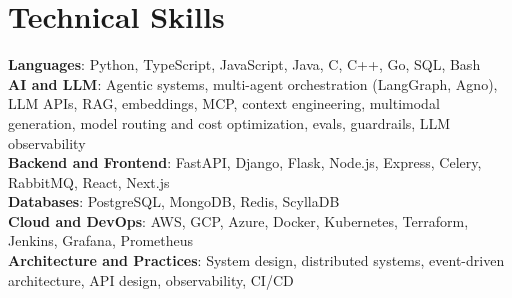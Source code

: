 \section{Technical Skills}
\small
\textbf{Languages}{: \small Python, TypeScript, JavaScript, Java, C, C++, Go, SQL, Bash} \\
\vspace{2.5pt}\textbf{AI and LLM}{: \small Agentic systems, multi-agent orchestration (LangGraph, Agno), LLM APIs, RAG, embeddings, MCP, context engineering, multimodal generation, model routing and cost optimization, evals, guardrails, LLM observability} \\
\vspace{2.5pt}\textbf{Backend and Frontend}{: \small FastAPI, Django, Flask, Node.js, Express, Celery, RabbitMQ, React, Next.js} \\
\vspace{2.5pt}\textbf{Databases}{: \small PostgreSQL, MongoDB, Redis, ScyllaDB} \\
\vspace{2.5pt}\textbf{Cloud and DevOps}{: \small AWS, GCP, Azure, Docker, Kubernetes, Terraform, Jenkins, Grafana, Prometheus} \\
\vspace{2.5pt}\textbf{Architecture and Practices}{: \small System design, distributed systems, event-driven architecture, API design, observability, CI/CD}
